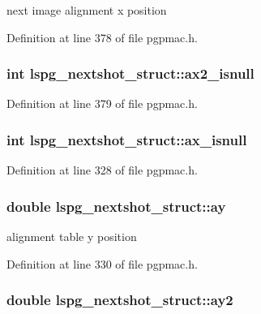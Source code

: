 next image alignment x position 



Definition at line 378 of file pgpmac.\-h.

\hypertarget{structlspg__nextshot__struct_a846845b0b9ecf6517ef85554771ec71d}{
\subsubsection[{ax2\-\_\-isnull}]{\setlength{\rightskip}{0pt plus 5cm}int lspg\-\_\-nextshot\-\_\-struct\-::ax2\-\_\-isnull}}\label{structlspg__nextshot__struct_a846845b0b9ecf6517ef85554771ec71d}


Definition at line 379 of file pgpmac.\-h.

\hypertarget{structlspg__nextshot__struct_aae46c7911b2b218497ad4a68f3dbb7d9}{
\subsubsection[{ax\-\_\-isnull}]{\setlength{\rightskip}{0pt plus 5cm}int lspg\-\_\-nextshot\-\_\-struct\-::ax\-\_\-isnull}}\label{structlspg__nextshot__struct_aae46c7911b2b218497ad4a68f3dbb7d9}


Definition at line 328 of file pgpmac.\-h.

\hypertarget{structlspg__nextshot__struct_a9e20b9a0aeb41f7f7d653a1c60335bf1}{
\subsubsection[{ay}]{\setlength{\rightskip}{0pt plus 5cm}double lspg\-\_\-nextshot\-\_\-struct\-::ay}}\label{structlspg__nextshot__struct_a9e20b9a0aeb41f7f7d653a1c60335bf1}


alignment table y position 



Definition at line 330 of file pgpmac.\-h.

\hypertarget{structlspg__nextshot__struct_ad13759740204b42e379161f98815f3d0}{
\subsubsection[{ay2}]{\setlength{\rightskip}{0pt plus 5cm}double lspg\-\_\-nextshot\-\_\-struct\-::ay2}}\label{structlspg__nextshot__struct_ad13759740204b42e379161f98815f3d0}


